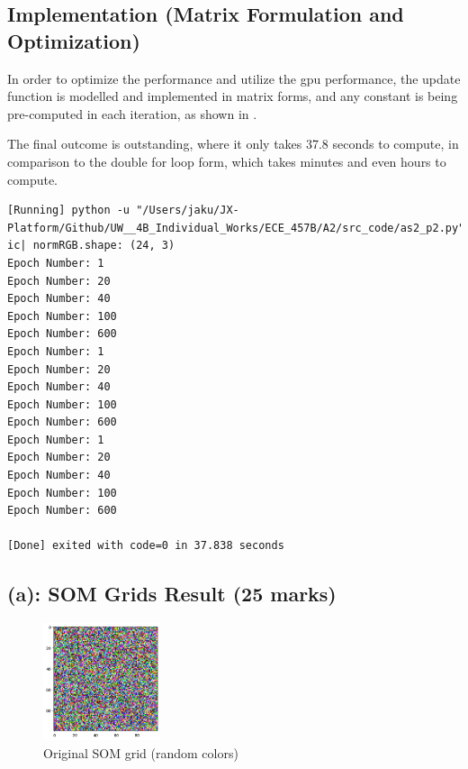 \documentclass{tron}
\begin{document}
\subsection{Implementation (Matrix Formulation and Optimization)}
In order to optimize the performance and utilize the gpu performance, the update function is modelled and implemented in matrix forms, and any constant is being pre-computed in each iteration, as shown in . 


The final outcome is outstanding, where it only takes 37.8 seconds to compute, in comparison to the double for loop form, which takes minutes and even hours to compute.
\begin{lstlisting}[style=mystyle:output]
[Running] python -u "/Users/jaku/JX-Platform/Github/UW__4B_Individual_Works/ECE_457B/A2/src_code/as2_p2.py"
ic| normRGB.shape: (24, 3)
Epoch Number: 1
Epoch Number: 20
Epoch Number: 40
Epoch Number: 100
Epoch Number: 600
Epoch Number: 1
Epoch Number: 20
Epoch Number: 40
Epoch Number: 100
Epoch Number: 600
Epoch Number: 1
Epoch Number: 20
Epoch Number: 40
Epoch Number: 100
Epoch Number: 600

[Done] exited with code=0 in 37.838 seconds
\end{lstlisting}

\subsection{(a): SOM Grids Result (25 marks)}

\begin{figure}[H]
	\center
	\includegraphics[height=130px]{../src_code/output/p2/w_0}
	\caption{Original SOM grid (random colors)}
\end{figure}
\end{document}
